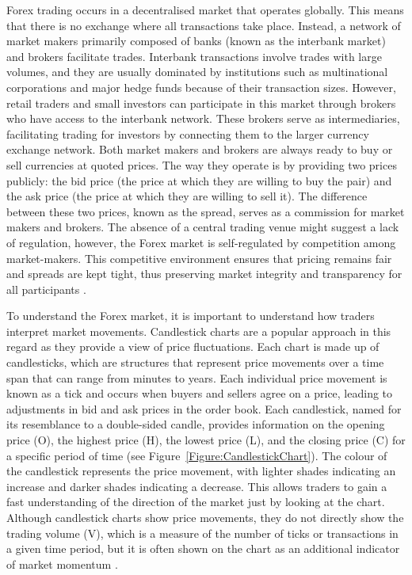 Forex trading occurs in a decentralised market that operates globally. This means that there is no exchange where all transactions take place. Instead, a network of market makers primarily composed of banks (known as the interbank market) and brokers facilitate trades. Interbank transactions involve trades with large volumes, and they are usually dominated by institutions such as multinational corporations and major hedge funds because of their transaction sizes. However, retail traders and small investors can participate in this market through brokers who have access to the interbank network. These brokers serve as intermediaries, facilitating trading for investors by connecting them to the larger currency exchange network. Both market makers and brokers are always ready to buy or sell currencies at quoted prices. The way they operate is by providing two prices publicly: the bid price (the price at which they are willing to buy the pair) and the ask price (the price at which they are willing to sell it). The difference between these two prices, known as the spread, serves as a commission for market makers and brokers. The absence of a central trading venue might suggest a lack of regulation, however, the Forex market is self-regulated by competition among market-makers. This competitive environment ensures that pricing remains fair and spreads are kept tight, thus preserving market integrity and transparency for all participants \cite{donnelly_art_2019}.

To understand the Forex market, it is important to understand how traders interpret market movements. Candlestick charts are a popular approach in this regard as they provide a view of price fluctuations. Each chart is made up of candlesticks, which are structures that represent price movements over a time span that can range from minutes to years. Each individual price movement is known as a tick and occurs when buyers and sellers agree on a price, leading to adjustments in bid and ask prices in the order book. Each candlestick, named for its resemblance to a double-sided candle, provides information on the opening price (O), the highest price (H), the lowest price (L), and the closing price (C) for a specific period of time (see Figure~\ref{Figure:CandlestickChart}). The colour of the candlestick represents the price movement, with lighter shades indicating an increase and darker shades indicating a decrease. This allows traders to gain a fast understanding of the direction of the market just by looking at the chart. Although candlestick charts show price movements, they do not directly show the trading volume (V), which is a measure of the number of ticks or transactions in a given time period, but it is often shown on the chart as an additional indicator of market momentum \cite{rhoads_candlestick_2022}.

